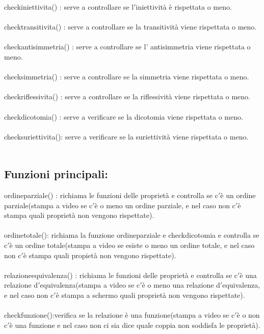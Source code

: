\documentclass[11pt, a4paper, titlepage, block]{article}
\begin{document}
	check\textunderscore iniettivita() : serve a controllare se l$'$iniettivit\`a \`e rispettata o meno.\\
	\\
	check\textunderscore transitivita() : serve a controllare se la transitivit\`a 
	viene rispettata o meno.\\
	\\
	check\textunderscore antisimmetria() : serve a controllare se l' antisimmetria viene rispettata o meno.\\
	\\
	check\textunderscore simmetria() : serve a controllare se la simmetria viene rispettata o meno.\\
	\\
	check\textunderscore riflessivita() : serve a controllare se la riflessivit\`a viene rispettata o meno.\\
	\\
	check\textunderscore dicotomia() : serve a verificare se la dicotomia viene rispettata o meno.\\
	\\
	check\textunderscore suriettivita(): serve a verificare se la suriettivit\`a viene rispettata o meno.\\
	\\
	\newpage
	\subsection{Funzioni principali:}
	ordine\textunderscore parziale() : richiama le funzioni delle propriet\`a e controlla se c$'$\`e un ordine parziale(stampa a video se c$'$\`e o meno un ordine parziale, e nel caso non c$'$\`e stampa quali propriet\`a non vengono rispettate).\\
	\\
	ordine\textunderscore totale(): richiama la funzione ordine\textunderscore parziale e check\textunderscore dicotomia e controlla se c$'$\`e un ordine totale(stampa a video se esiste o meno un ordine totale, e nel caso non c$'$\`e stampa quali propiet\`a non vengono rispettate).\\
	\\
	relazione\textunderscore equivalenza() : richiama le funzioni delle propriet\`a e controlla se c$'$\`e una relazione d$'$equivalenza(stampa a video se c$'$\`e o meno una relazione d$'$equivalenza, e nel caso non c$'$\`e stampa a schermo quali propriet\`a non vengono rispettate).\\
	\\
	check\textunderscore funzione():verifica se la relazione \`e una funzione(stampa  a video se c$'$\`e o non c$'$\`e una funzione e nel caso non ci sia dice quale coppia non soddisfa le propriet\`a).\\
	\\
	\newpage  
\end{document}
